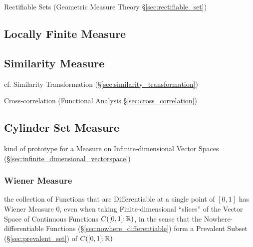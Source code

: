 \fist Rectifiable Sets (Geometric Measure Theory \S\ref{sec:rectifiable_set})



\subsection{Locally Finite Measure}\label{sec:locally_finite_measure}

\subsection{Similarity Measure}\label{sec:similarity_measure}

\fist cf. Similarity Transformation (\S\ref{sec:similarity_transformation})

Cross-correlation (Functional Analysis \S\ref{sec:cross_correlation})



\subsection{Cylinder Set Measure}\label{sec:cylinder_set_measure}

kind of prototype for a Measure on Infinite-dimensional Vector Spaces
(\S\ref{sec:infinite_dimensional_vectorspace})



\subsubsection{Wiener Measure}\label{sec:wiener_measure}\hfill

the collection of Functions that are Differentiable at a single point of
$[0,1]$ has Wiener Measure $0$, even when taking Finite-dimensional ``slices''
of the Vector Space of Continuous Functions $C([0,1];\mathbb{R})$, in the sense
that the Nowhere-differentiable Functions (\S\ref{sec:nowhere_differentiable})
form a Prevalent Subset (\S\ref{sec:prevalent_set}) of $C([0,1]; \mathbb{R})$



